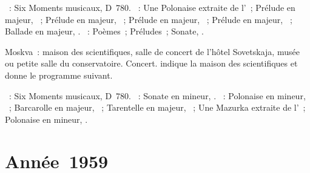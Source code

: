 \begin{description}
 \textsc{\Schubert{}}~: Six Moments musicaux, D~780.
 \textsc{\Chopin{}}~: Une Polonaise extraite de l'~; Prélude en \kD
 \Flat majeur,  ~; Prélude en \kA \Flat majeur,
  ~; Prélude en \kE \Flat majeur, 
 ~; Prélude en \kB \Flat majeur,  ~; Ballade
 en \kA \Flat majeur, .
 \textsc{\Scriabine{}}~: Poèmes~; Préludes~; Sonate, .
 \item[\DateWithWeekDay{1958-12-21}]
 Moskva~: maison des scientifiques, salle de concert de l'hôtel Sovetskaja,
 musée \Scriabine{} ou petite salle du conservatoire.
 Concert.
 \citet[p.~181]{Nekrasova08} indique la maison des scientifiques et donne le
 programme suivant.

 \textsc{\Schubert{}}~: Six Moments musicaux, D~780.
 \textsc{\Schumann{}}~: Sonate en \kF \Sharp mineur, .
 \textsc{\Chopin{}}~: Polonaise en \kC \Sharp mineur,  ~;
 Barcarolle en \kF \Sharp majeur, ~; Tarentelle en \kA \Flat
 majeur, ~; Une Mazurka extraite de l'~; Polonaise en \kF
 \Sharp mineur, .
\end{description}

\section{Année~1959}


